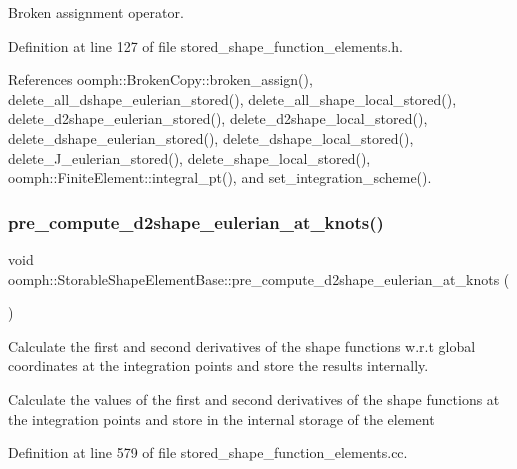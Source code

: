 Broken assignment operator. 



Definition at line 127 of file stored\+\_\+shape\+\_\+function\+\_\+elements.\+h.



References oomph\+::\+Broken\+Copy\+::broken\+\_\+assign(), delete\+\_\+all\+\_\+dshape\+\_\+eulerian\+\_\+stored(), delete\+\_\+all\+\_\+shape\+\_\+local\+\_\+stored(), delete\+\_\+d2shape\+\_\+eulerian\+\_\+stored(), delete\+\_\+d2shape\+\_\+local\+\_\+stored(), delete\+\_\+dshape\+\_\+eulerian\+\_\+stored(), delete\+\_\+dshape\+\_\+local\+\_\+stored(), delete\+\_\+\+J\+\_\+eulerian\+\_\+stored(), delete\+\_\+shape\+\_\+local\+\_\+stored(), oomph\+::\+Finite\+Element\+::integral\+\_\+pt(), and set\+\_\+integration\+\_\+scheme().

\mbox{\label{classoomph_1_1StorableShapeElementBase_a771a9c843fa71c2264ad0d653ec01d1a}} 
\subsubsection{\texorpdfstring{pre\+\_\+compute\+\_\+d2shape\+\_\+eulerian\+\_\+at\+\_\+knots()}{pre\_compute\_d2shape\_eulerian\_at\_knots()}}
{\footnotesize\ttfamily void oomph\+::\+Storable\+Shape\+Element\+Base\+::pre\+\_\+compute\+\_\+d2shape\+\_\+eulerian\+\_\+at\+\_\+knots (\begin{DoxyParamCaption}{ }\end{DoxyParamCaption})}



Calculate the first and second derivatives of the shape functions w.\+r.\+t global coordinates at the integration points and store the results internally. 

Calculate the values of the first and second derivatives of the shape functions at the integration points and store in the internal storage of the element 

Definition at line 579 of file stored\+\_\+shape\+\_\+function\+\_\+elements.\+cc.



